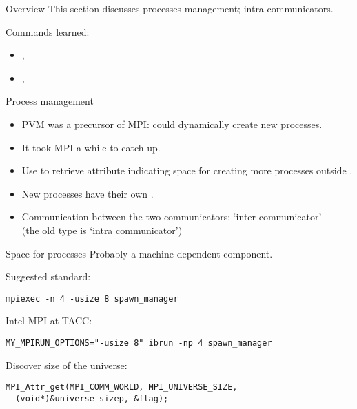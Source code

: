 
\begin{frame}[containsverbatim]{Overview}
  This section discusses processes management; intra communicators.

  Commands learned:
  \begin{itemize}
  \item {}, 
  \item {}, 
  \end{itemize}
\end{frame}

\begin{frame}[containsverbatim]{Process management}
  \begin{itemize}
  \item PVM was a precursor of MPI: could dynamically create new
    processes.
  \item It took MPI a while to catch up.
  \item Use  to retrieve
     attribute indicating space for
    creating more processes outside .
  \item New processes have their own .
  \item Communication between the two communicators: `inter
    communicator'\\ (the old type is `intra communicator')
  \end{itemize}
\end{frame}

\begin{frame}[containsverbatim]{Space for processes}
  Probably a machine dependent component.

  Suggested standard:
\begin{verbatim}
mpiexec -n 4 -usize 8 spawn_manager
\end{verbatim}

  Intel MPI at TACC:
\begin{verbatim}
MY_MPIRUN_OPTIONS="-usize 8" ibrun -np 4 spawn_manager
\end{verbatim}
Discover size of the universe:
\begin{lstlisting}
MPI_Attr_get(MPI_COMM_WORLD, MPI_UNIVERSE_SIZE,
  (void*)&universe_sizep, &flag);
\end{lstlisting}
\end{frame}

